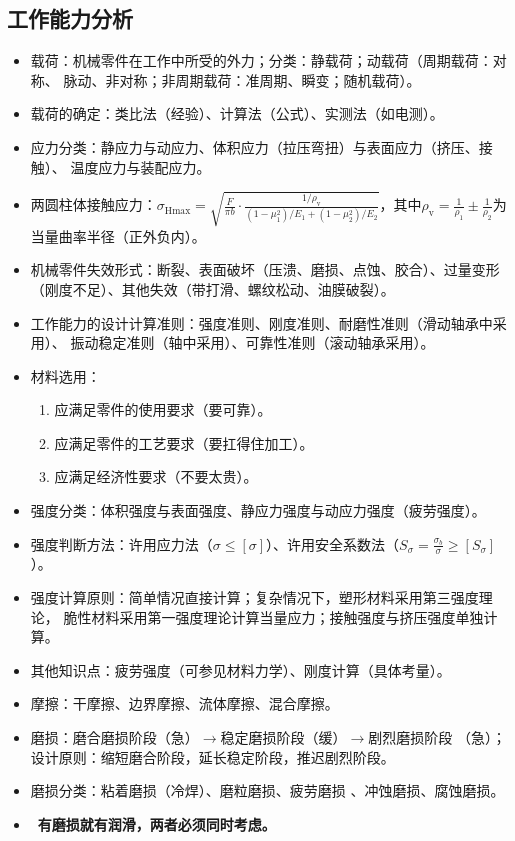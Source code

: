 \documentclass[12pt,a4paper]{article}
\newcommand{\tightlist}{\setlength{\parskip}{0pt}\setlength{\itemsep}{0pt}}
\newcommand{\hint}[1]{\textsf{（#1）}}
\newcommand{\minor}[1]{{\color{gray} #1}}
\newcommand{\then}{$\to$}
\renewcommand{\emph}[1]{\faIcon[regular]{lightbulb}\ \textbf{#1}}
\begin{document}
\subsection{工作能力分析}
\begin{itemize}\tightlist
    \item 载荷：机械零件在工作中所受的外力；分类：静载荷；动载荷\hint{周期载荷：对称、
    脉动、非对称；非周期载荷：准周期、瞬变；随机载荷}。
    \item \minor{载荷的确定：类比法\hint{经验}、计算法\hint{公式}、实测法\hint{如电测}。}
    \item 应力分类：静应力与动应力、体积应力\hint{拉压弯扭}与表面应力\hint{挤压、接触}、
    温度应力与装配应力。
    \item \minor{两圆柱体接触应力：$\sigma_\text{Hmax}=\sqrt{\frac F{\pi b}\cdot
    \frac{1/\rho_\text{v}}{(1-\mu_1^2)/E_1+(1-\mu_2^2)/E_2}}$，其中$\rho_\text{v}
    =\frac1{\rho_1}\pm\frac1{\rho_2}$为当量曲率半径\hint{正外负内}。}
    \item 机械零件失效形式：断裂、表面破坏\hint{压溃、磨损、点蚀、胶合}、过量变形
    \hint{刚度不足}、其他失效\hint{带打滑、螺纹松动、油膜破裂}。
    \item 工作能力的设计计算准则：强度准则、刚度准则、耐磨性准则\hint{滑动轴承中采用}、
    振动稳定准则\hint{轴中采用}、可靠性准则\hint{滚动轴承采用}。
    \item 材料选用：
    \begin{enumerate}\tightlist
        \item 应满足零件的使用要求\hint{要可靠}。
        \item 应满足零件的工艺要求\hint{要扛得住加工}。
        \item 应满足经济性要求\hint{不要太贵}。
    \end{enumerate}
    \item 强度分类：体积强度与表面强度、静应力强度与动应力强度\hint{疲劳强度}。
    \item 强度判断方法：许用应力法\hint{$\sigma\leq[\sigma]$}、许用安全系数法\hint%
    {$S_\sigma=\frac{\sigma_b}{\sigma}\geq[S_\sigma]$}。
    \item \minor{强度计算原则：简单情况直接计算；复杂情况下，塑形材料采用第三强度理论，
    脆性材料采用第一强度理论计算当量应力；接触强度与挤压强度单独计算。}
    \item \minor{其他知识点：疲劳强度\hint{可参见材料力学}、刚度计算\hint{具体考量}。}
    \item \minor{摩擦：干摩擦、边界摩擦、流体摩擦、混合摩擦。}
    \item 磨损：磨合磨损阶段\hint{急}\then 稳定磨损阶段\hint{缓}\then 剧烈磨损阶段
    \hint{急}；设计原则：缩短磨合阶段，延长稳定阶段，推迟剧烈阶段。
    \item 磨损分类：粘着磨损\hint{冷焊}、磨粒磨损、疲劳磨损\minor{、冲蚀磨损、腐蚀磨损}。
    \item \emph{有磨损就有润滑，两者必须同时考虑。}
\end{itemize}
\end{document}

